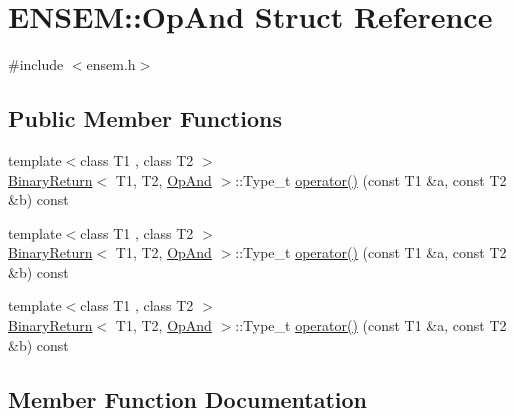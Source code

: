 \hypertarget{structENSEM_1_1OpAnd}{}\section{E\+N\+S\+EM\+:\+:Op\+And Struct Reference}
\label{structENSEM_1_1OpAnd}


{\ttfamily \#include $<$ensem.\+h$>$}

\subsection*{Public Member Functions}
\begin{DoxyCompactItemize}
\item 
{\footnotesize template$<$class T1 , class T2 $>$ }\\\mbox{\hyperlink{structENSEM_1_1BinaryReturn}{Binary\+Return}}$<$ T1, T2, \mbox{\hyperlink{structENSEM_1_1OpAnd}{Op\+And}} $>$\+::Type\+\_\+t \mbox{\hyperlink{structENSEM_1_1OpAnd_a05e5e9860556ea062a49cdb289806548}{operator()}} (const T1 \&a, const T2 \&b) const
\item 
{\footnotesize template$<$class T1 , class T2 $>$ }\\\mbox{\hyperlink{structENSEM_1_1BinaryReturn}{Binary\+Return}}$<$ T1, T2, \mbox{\hyperlink{structENSEM_1_1OpAnd}{Op\+And}} $>$\+::Type\+\_\+t \mbox{\hyperlink{structENSEM_1_1OpAnd_a05e5e9860556ea062a49cdb289806548}{operator()}} (const T1 \&a, const T2 \&b) const
\item 
{\footnotesize template$<$class T1 , class T2 $>$ }\\\mbox{\hyperlink{structENSEM_1_1BinaryReturn}{Binary\+Return}}$<$ T1, T2, \mbox{\hyperlink{structENSEM_1_1OpAnd}{Op\+And}} $>$\+::Type\+\_\+t \mbox{\hyperlink{structENSEM_1_1OpAnd_a05e5e9860556ea062a49cdb289806548}{operator()}} (const T1 \&a, const T2 \&b) const
\end{DoxyCompactItemize}


\subsection{Member Function Documentation}
\mbox{\label{structENSEM_1_1OpAnd_a05e5e9860556ea062a49cdb289806548}} 
